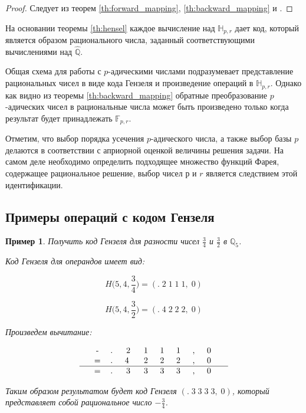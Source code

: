 \documentclass[master, och, diploma, times]{sty/SCWorks}
\theoremstyle{plain}
\newtheorem{exmp}{Пример}[section]
\theoremstyle{definition}
\numberwithin{equation}{section}
\begin{document}
\begin{proof} 
Следует из теорем \ref{th:forward_mapping}, \ref{th:backward_mapping} и \cite{bib:numbers:krishnamurthy}.
\end{proof}

На основании теоремы \ref{th:hensel} каждое вычисление над $\mathbb{H}_{p,r}$ дает код, который является образом рационального числа, заданный соответствующими вычислениями над $\hat{\mathbb{Q}}$.


Общая схема для работы с $p$-адическими числами подразумевает представление рациональных чисел в виде кода Гензеля и произведение операций в $\mathbb{H}_{p,r}$. Однако как видно из теоремы \ref{th:backward_mapping} обратные преобразование $p$-адических чисел в рациональные числа может быть произведено только когда результат будет принадлежать $\mathbb{F}_{p,r}$.

Отметим, что выбор порядка усечения $p$-адического числа, а также выбор базы $p$ делаются в соответствии с априорной оценкой величины решения задачи. На самом деле необходимо определить подходящее множество функций Фарея, содержащее рациональное решение, выбор чисел $р$ и $r$ является следствием этой идентификации.

\subsection{Примеры операций с кодом Гензеля}

\begin{exmp}
Получить код Гензеля для разности чисел $\frac{3}{4}$ и $\frac{3}{2}$ в $\mathbb{Q}_5$.

\noindent Код Гензеля для операндов имеет вид:

$$H\bigg(5,4, \frac{3}{4}\bigg)=(.\; 2\; 1\; 1\; 1,\; 0)$$

$$H\bigg(5,4, \frac{3}{2}\bigg)=(.\; 4\; 2\; 2\; 2,\; 0)$$


\noindent Произведем вычитание:

$$
\begin{tabular}{ccccccccccc}
& - & .\; & 2\; & 1\; & 1\; & 1\; & ,\; & 0\; &  \\
& = & .\; & 4 \; & 2\; & 2\; & 2\; & ,\; & 0\; &  \\
\hline
& = & .\; & 3\; & 3\; & 3\; & 3\; & ,\; & 0\; &
\end{tabular}
$$


\noindent Таким образом результатом будет код Гензеля $(.\; 3\; 3\; 3\; 3,\; 0)$, который представляет собой рациональное число $-\frac{3}{4}$.
\end{exmp}
\end{document}
